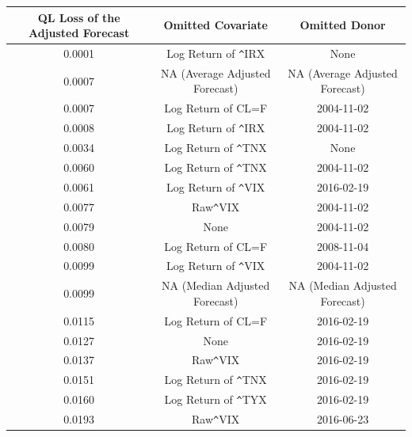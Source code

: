 \documentclass{uiucthesis2021}
\theoremstyle{definition}
\begin{document}
  \begin{table}[h]
    \centering
     \label{tab:multiverse_table} 

    \begingroup\fontsize{6.5pt}{6.5pt}\selectfont
    \begin{tabular}{ccc}
      
      \hline
      QL Loss of the Adjusted Forecast& Omitted Covariate & Omitted Donor \\ 
         \hline
    0.0001 & Log Return of \verb|^|IRX & None \\ 
    \rowcolor{gray} 0.0007 & NA (Average Adjusted Forecast) & NA (Average Adjusted Forecast)\\  
      0.0007 & Log Return of CL=F & 2004-11-02 \\ 
      0.0008 & Log Return of \verb|^|IRX & 2004-11-02 \\ 
      0.0034 & Log Return of \verb|^|TNX & None \\ 
      0.0060 & Log Return of \verb|^|TNX & 2004-11-02 \\ 
      0.0061 & Log Return of \verb|^|VIX & 2016-02-19 \\ 
      0.0077 & Raw\verb|^|VIX & 2004-11-02 \\ 
      0.0079 & None & 2004-11-02 \\ 
      0.0080 & Log Return of CL=F & 2008-11-04 \\ 
      0.0099 & Log Return of \verb|^|VIX & 2004-11-02 \\ 
      \rowcolor{gray}  0.0099 & NA (Median Adjusted Forecast) & NA (Median Adjusted Forecast)\\  
      0.0115 & Log Return of CL=F & 2016-02-19 \\ 
      0.0127 & None & 2016-02-19 \\ 
      0.0137 & Raw\verb|^|VIX & 2016-02-19 \\ 
      0.0151 & Log Return of \verb|^|TNX & 2016-02-19 \\ 
      0.0160 & Log Return of \verb|^|TYX & 2016-02-19 \\ 
      0.0193 & Raw\verb|^|VIX & 2016-06-23 \\ 

\end{tabular}
\end{table}
\end{document}

